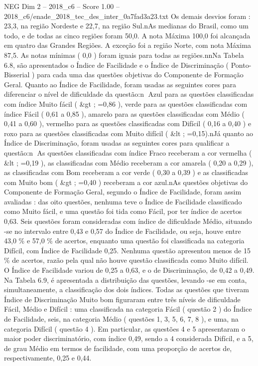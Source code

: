 \begin{textsample}{NEG Dim 2 – 2018\_c6 – Score 1.00 – 2018\_c6/enade\_2018\_tec\_des\_inter\_0a7fad3a23.txt}
Os demais desvios foram : 23,3, na região Nordeste e 22,7, na região Sul.nAs medianas do Brasil, como um todo, e de todas as cinco regiões foram 50,0.
A nota Máxima 100,0 foi alcançada em quatro das Grandes Regiões.
A exceção foi a região Norte, com nota Máxima 87,5.
As notas mínimas ( 0,0 ) foram iguais para todas as regiões.nnNa Tabela 6.8, são apresentados o Índice de Facilidade e o Índice de Discriminação ( Ponto-Bisserial ) para cada uma das questões objetivas do Componente de Formação Geral.
Quanto ao Índice de Facilidade, foram usadas as seguintes cores para diferenciar o nível de dificuldade da questão:n Azul para as questões classificadas com índice Muito fácil ( \&gt ; =0,86 ), verde para as questões classificadas com índice Fácil ( 0,61 a 0,85 ), amarelo para as questões classificadas com Médio ( 0,41 a 0,60 ), vermelho para as questões classificadas com Difícil ( 0,16 a 0,40 ) e roxo para as questões classificadas com Muito difícil ( \&lt ; =0,15).nJá quanto ao Índice de Discriminação, foram usadas as seguintes cores para qualificar a questão:n As questões classificadas com índice Fraco receberam a cor vermelha ( \&lt ; =0,19 ), as classificadas com Médio receberam a cor amarela ( 0,20 a 0,29 ), as classificadas com Bom receberam a cor verde ( 0,30 a 0,39 ) e as classificadas com Muito bom ( \&gt ; =0,40 ) receberam a cor azul.nAs questões objetivas do Componente de Formação Geral, segundo o Índice de Facilidade, foram assim avaliadas : das oito questões, nenhuma teve o Índice de Facilidade classificado como Muito fácil, e uma questão foi tida como Fácil, por ter índice de acertos 0,63.
Seis questões foram consideradas com índice de dificuldade Médio, situando -se no intervalo entre 0,43 e 0,57 do Índice de Facilidade, ou seja, houve entre 43,0 \% e 57,0 \% de acertos, enquanto uma questão foi classificada na categoria Difícil, com Índice de Facilidade 0,25.
Nenhuma questão apresentou menos de 15 \% de acertos, razão pela qual não houve questão classificada como Muito difícil.
O Índice de Facilidade variou de 0,25 a 0,63, e o de Discriminação, de 0,42 a 0,49.
Na Tabela 6.9, é apresentada a distribuição das questões, levando -se em conta, simultaneamente, a classificação dos dois índices.
Todas as questões que tiveram Índice de Discriminação Muito bom figuraram entre três níveis de dificuldade Fácil, Médio e Difícil : uma classificada na categoria Fácil ( questão 2 ) do Índice de Facilidade, seis, na categoria Médio ( questões 1, 3, 5, 6, 7, 8 ), e uma, na categoria Difícil ( questão 4 ).
Em particular, as questões 4 e 5 apresentaram o maior poder discriminatório, com índice 0,49, sendo a 4 considerada Difícil, e a 5, de grau Médio em termos de facilidade, com uma proporção de acertos de, respectivamente, 0,25 e 0,44.

\end{textsample}
